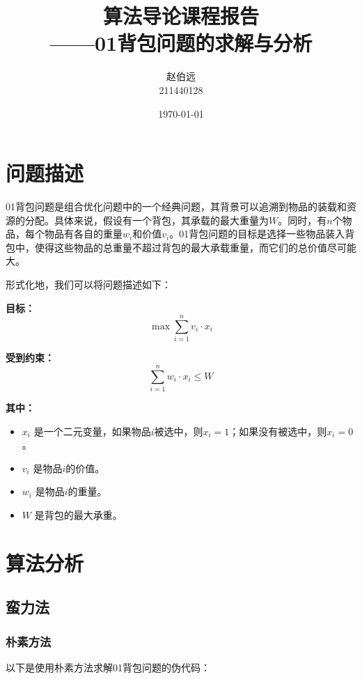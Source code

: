 \documentclass[UTF8,titlepage]{ctexart}
\numberwithin{figure}{section}
\begin{document}
\title{算法导论课程报告 \\ \large{——01背包问题的求解与分析}}
\author{赵伯远 \\ 211440128}
\date{\today}
\maketitle
\tableofcontents
\clearpage

\section{问题描述}

01背包问题是组合优化问题中的一个经典问题，其背景可以追溯到物品的装载和资源的分配。具体来说，假设有一个背包，其承载的最大重量为\( W \)。同时，有\( n \)个物品，每个物品有各自的重量\( w_i \)和价值\( v_i \)。01背包问题的目标是选择一些物品装入背包中，使得这些物品的总重量不超过背包的最大承载重量，而它们的总价值尽可能大。

形式化地，我们可以将问题描述如下：

\textbf{目标：}
\begin{equation}
    \max \sum_{i=1}^{n} v_i \cdot x_i
\end{equation}

\textbf{受到约束：}
\begin{equation}
    \sum_{i=1}^{n} w_i \cdot x_i \leq W
\end{equation}

\textbf{其中：}
\begin{itemize}
    \item \( x_i \) 是一个二元变量，如果物品\( i \)被选中，则\( x_i = 1 \)；如果没有被选中，则\( x_i = 0 \)。
    \item \( v_i \) 是物品\( i \)的价值。
    \item \( w_i \) 是物品\( i \)的重量。
    \item \( W \) 是背包的最大承重。
\end{itemize}

\section{算法分析}

\subsection{蛮力法}

\subsubsection{朴素方法}
以下是使用朴素方法求解01背包问题的伪代码：
\end{document}

